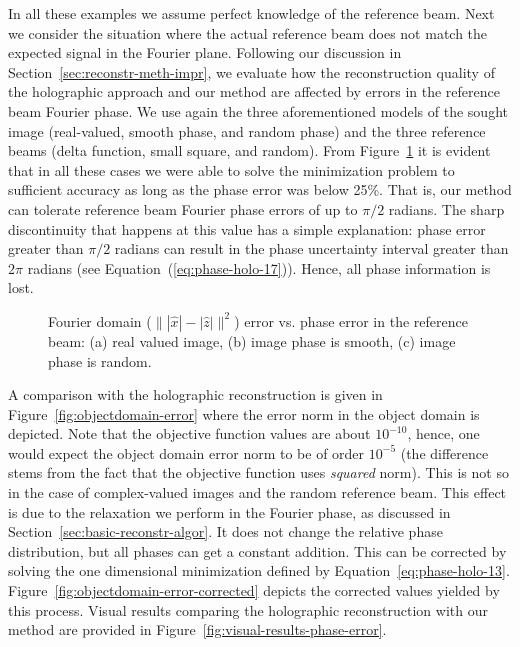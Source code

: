 In all these examples we assume perfect knowledge of the reference
beam. Next we consider the situation where the actual reference
beam does not match the expected signal in the Fourier plane.
Following our discussion in Section~\ref{sec:reconstr-meth-impr},
we evaluate how the reconstruction quality of the holographic
approach and our method are affected by errors in the reference
beam Fourier phase. We use again the three aforementioned models
of the sought image (real-valued, smooth phase, and random phase)
and the three reference beams (delta function, small square, and
random). From Figure~\ref{fig:we-successrate} it is evident that in
all these cases we were able to solve the minimization problem to
sufficient accuracy as long as the phase error was below 25\%.
That is, our method can tolerate reference
beam Fourier phase errors of up to $\pi/2$ radians. The sharp
discontinuity that happens at this value has a
simple explanation: phase error greater than $\pi/2$ radians can
result in the phase uncertainty interval greater than $2\pi$ radians
(see Equation~(\ref{eq:phase-holo-17})).  Hence, all phase information is
lost.

\begin{figure}[H]
  \centering
  \qquad{}
  \caption[Fourier domain error vs. phase
    error in the reference beam]{Fourier domain ($\||\hat{x}| - |\hat{z}|\|^{2}$) error vs. phase
    error in the reference beam: (a) real valued image,
    (b) image phase is smooth, (c) image phase is random. }
  \label{fig:we-successrate}
\end{figure}

A comparison
with the holographic reconstruction is given in
Figure~\ref{fig:objectdomain-error} where the error norm in the
object domain is depicted. Note that the objective function values
are about $10^{-10}$, hence, one would expect the object domain
error norm to be of order $10^{-5}$ (the difference stems from the
fact that the objective function uses \textit{squared} norm). This
is not so in the case of complex-valued images and the random
reference beam. This effect is due to the relaxation we perform in
the Fourier phase, as discussed in
Section~\ref{sec:basic-reconstr-algor}. It does not change the
relative phase distribution, but all phases can get a constant
addition. This can be corrected by solving the one dimensional
minimization defined by Equation~\eqref{eq:phase-holo-13}.
Figure~\ref{fig:objectdomain-error-corrected} depicts the corrected
values yielded by this process. Visual results comparing the
holographic reconstruction with our method are provided in
Figure~\ref{fig:visual-results-phase-error}. 




